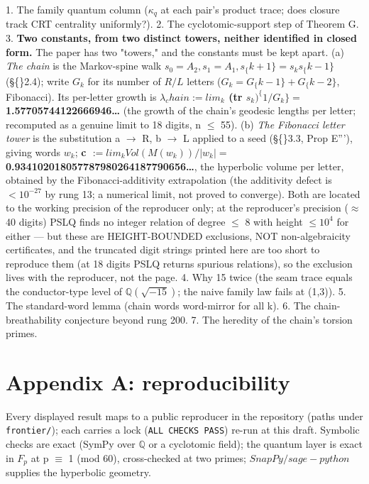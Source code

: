 \documentclass[11pt]{article}
\theoremstyle{plain}
\theoremstyle{definition}
\theoremstyle{remark}
\begin{document}
1. The family quantum column (\(\kappa _{q}\) at each pair's product trace; does closure track CRT centrality uniformly?). 2. The cyclotomic-support step of Theorem G. 3. \textbf{Two constants, from two distinct towers, neither identified in closed form.} The paper has two "towers," and the constants must be kept apart. (a) \emph{The chain} is the Markov-spine walk \(s_{0} = A_{2}, s_{1} = A_{1}, s_\{k+1\} = s_{k} s_\{k-1\}\) (\S\{\}2.4); write \(G_{k}\) for its number of \(R/L\) letters (\(G_{k} = G_\{k-1\} + G_\{k-2\}\), Fibonacci). Its per-letter growth is \textbf{\(\lambda _{c}hain := lim_{k}\) (tr \(s_{k})^\{1/G_{k}\} =\) 1.57705744122666946…} (the growth of the chain's geodesic lengths per letter; recomputed as a genuine limit to 18 digits, n \(\le \) 55). (b) \emph{The Fibonacci letter tower} is the substitution a \(\to \) R, b \(\to \) L applied to a seed (\S\{\}3.3, Prop E'''), giving words \(w_{k}\); \textbf{c \(:= lim_{k} Vol(M(w_{k}))/|w_{k}| =\) 0.934102018057787980264187790656…}, the hyperbolic volume per letter, obtained by the Fibonacci-additivity extrapolation (the additivity defect is \(< 10^{-27}\) by rung 13; a numerical limit, not proved to converge). Both are located to the working precision of the reproducer only; at the reproducer's precision (\(\approx \) 40 digits) PSLQ finds no integer relation of degree \(\le \) 8 with height \(\le  10^{4}\) for either — but these are HEIGHT-BOUNDED exclusions, NOT non-algebraicity certificates, and the truncated digit strings printed here are too short to reproduce them (at 18 digits PSLQ returns spurious relations), so the exclusion lives with the reproducer, not the page. 4. Why 15 twice (the seam trace equals the conductor-type level of \(\mathbb{Q}(\sqrt{-15})\); the naive family law fails at (1,3)). 5. The standard-word lemma (chain words word-mirror for all k). 6. The chain-breathability conjecture beyond rung 200. 7. The heredity of the chain's torsion primes.

\section{Appendix A: reproducibility}

Every displayed result maps to a public reproducer in the repository (paths under \texttt{frontier/}); each carries a lock (\texttt{ALL CHECKS PASS}) re-run at this draft. Symbolic checks are exact (SymPy over \(\mathbb{Q}\) or a cyclotomic field); the quantum layer is exact in \(F_{p}\) at p \(\equiv \) 1 (mod 60), cross-checked at two primes; \(SnapPy/sage-python\) supplies the hyperbolic geometry.
\end{document}
